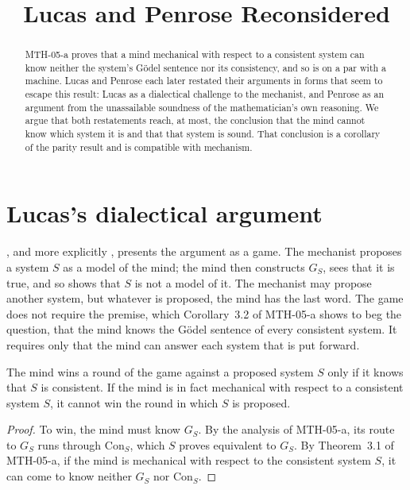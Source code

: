 \documentclass{situationist-preprint}
\title{Lucas and Penrose Reconsidered}
\begin{document}
\maketitle

\begin{abstract}
MTH-05-a proves that a mind mechanical with respect to a consistent system can know neither the system's G\"odel sentence nor its consistency, and so is on a par with a machine. Lucas and Penrose each later restated their arguments in forms that seem to escape this result: Lucas as a dialectical challenge to the mechanist, and Penrose as an argument from the unassailable soundness of the mathematician's own reasoning. We argue that both restatements reach, at most, the conclusion that the mind cannot know which system it is and that that system is sound. That conclusion is a corollary of the parity result and is compatible with mechanism.
\end{abstract}

\section{Lucas's dialectical argument}\label{s:lucas}

\citet{Lucas1961}, and more explicitly \citet{Lucas1996}, presents the argument as a game. The mechanist proposes a system $S$ as a model of the mind; the mind then constructs $G_S$, sees that it is true, and so shows that $S$ is not a model of it. The mechanist may propose another system, but whatever is proposed, the mind has the last word. The game does not require the premise, which Corollary~3.2 of MTH-05-a shows to beg the question, that the mind knows the G\"odel sentence of every consistent system. It requires only that the mind can answer each system that is put forward.

\begin{proposition}\label{p:game}
The mind wins a round of the game against a proposed system $S$ only if it knows that $S$ is consistent. If the mind is in fact mechanical with respect to a consistent system $S$, it cannot win the round in which $S$ is proposed.
\end{proposition}

\begin{proof}
To win, the mind must know $G_S$. By the analysis of MTH-05-a, its route to $G_S$ runs through $\mathrm{Con}_S$, which $S$ proves equivalent to $G_S$. By Theorem~3.1 of MTH-05-a, if the mind is mechanical with respect to the consistent system $S$, it can come to know neither $G_S$ nor $\mathrm{Con}_S$.
\end{proof}
\end{document}
